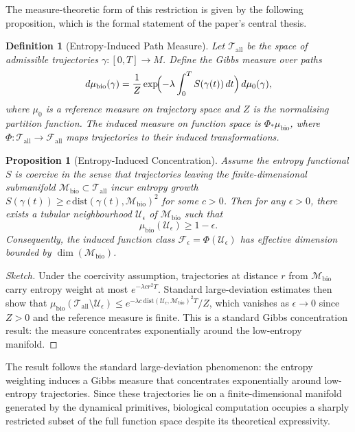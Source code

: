 \documentclass[12pt, a4paper]{article}
\newtheorem{definition}[theorem]{Definition}
\newtheorem{proposition}[theorem]{Proposition}
\theoremstyle{remark}
\theoremstyle{definition}
\begin{document}
The measure-theoretic form of this restriction is given by the following proposition, which
is the formal statement of the paper's central thesis.

\begin{definition}[Entropy-Induced Path Measure]
Let $\mathcal{T}_{\mathrm{all}}$ be the space of admissible trajectories $\gamma\colon[0,T]\to M$.
Define the Gibbs measure over paths
\[
d\mu_{\mathrm{bio}}(\gamma)
= \frac{1}{Z}\exp\!\Bigl(-\lambda\int_0^T S(\gamma(t))\,dt\Bigr)\,d\mu_0(\gamma),
\]
where $\mu_0$ is a reference measure on trajectory space and $Z$ is the normalising
partition function.  The induced measure on function space is $\Phi_*\mu_{\mathrm{bio}}$,
where $\Phi\colon\mathcal{T}_{\mathrm{all}}\to\mathcal{F}_{\mathrm{all}}$ maps trajectories
to their induced transformations.
\end{definition}

\begin{proposition}[Entropy-Induced Concentration]
\label{prop:concentration_app}
Assume the entropy functional $S$ is coercive in the sense that trajectories leaving the
finite-dimensional submanifold $\mathcal{M}_{\mathrm{bio}} \subset \mathcal{T}_{\mathrm{all}}$
incur entropy growth $S(\gamma(t)) \ge c\,\mathrm{dist}(\gamma(t), \mathcal{M}_{\mathrm{bio}})^2$
for some $c > 0$.  Then for any $\epsilon > 0$, there exists a tubular neighbourhood
$\mathcal{U}_\epsilon$ of $\mathcal{M}_{\mathrm{bio}}$ such that
\[
\mu_{\mathrm{bio}}(\mathcal{U}_\epsilon) \ge 1 - \epsilon.
\]
Consequently, the induced function class $\mathcal{F}_\epsilon = \Phi(\mathcal{U}_\epsilon)$
has effective dimension bounded by $\dim(\mathcal{M}_{\mathrm{bio}})$.
\end{proposition}

\begin{proof}[Sketch]
Under the coercivity assumption, trajectories at distance $r$ from $\mathcal{M}_{\mathrm{bio}}$
carry entropy weight at most $e^{-\lambda c r^2 T}$.  Standard large-deviation estimates
then show that $\mu_{\mathrm{bio}}(\mathcal{T}_{\mathrm{all}} \setminus \mathcal{U}_\epsilon)
\le e^{-\lambda c\, \mathrm{dist}(\mathcal{U}_\epsilon, \mathcal{M}_{\mathrm{bio}})^2 T}/Z$,
which vanishes as $\epsilon \to 0$ since $Z > 0$ and the reference measure is finite.
This is a standard Gibbs concentration result: the measure concentrates exponentially
around the low-entropy manifold.
\end{proof}

The result follows the standard large-deviation phenomenon: the entropy weighting induces a
Gibbs measure that concentrates exponentially around low-entropy trajectories.  Since these
trajectories lie on a finite-dimensional manifold generated by the dynamical primitives,
biological computation occupies a sharply restricted subset of the full function space
despite its theoretical expressivity.
\end{document}

